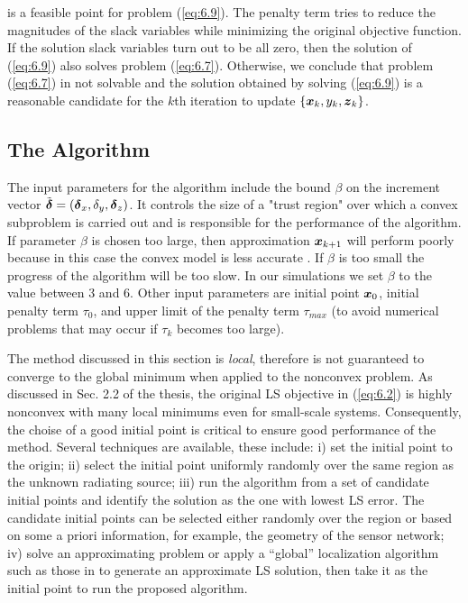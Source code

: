 \noindent
is a feasible point for problem (\ref{eq:6.9}). The penalty term tries to reduce the magnitudes of the slack variables while minimizing the original objective function. If the solution slack variables turn out to be all zero, then the solution  of (\ref{eq:6.9}) also solves problem (\ref{eq:6.7}). Otherwise, we conclude that problem (\ref{eq:6.7}) in not solvable and the solution obtained by solving (\ref{eq:6.9}) is a reasonable candidate for the $k$th iteration to update $\{\mbox{\boldmath$x$}_k, y_k, \mbox{\boldmath$z$}_k\}$.

\subsection{The Algorithm}

The input parameters for the algorithm include the bound $\beta$ on the increment vector $\tilde{\mbox{\boldmath${\delta}$}} =\left(
\mbox{\boldmath${\delta}$}_x, \delta_y, \mbox{\boldmath${\delta}$}_z\right)$. It controls the size of a "trust region" over which a convex subproblem is carried out and is responsible for the performance of the algorithm. If parameter $\beta$ is chosen too large, then approximation $\mbox{\boldmath$x$}_{k+1}$ will perform poorly because in this case the convex model is less accurate \cite{OPTII}. If $\beta$ is too small the progress of the algorithm will be too slow. In our simulations we set  $\beta$ to the value between 3 and 6. Other input parameters are initial point $\mbox{\boldmath$x$}_0$, initial penalty term $\tau_0$, and upper limit of the penalty term $\tau_{max}$ (to avoid numerical problems that may occur  if $\tau_k$ becomes too large).

The method discussed in this section is \textit{local}, therefore is not guaranteed to converge to the global minimum when applied to the nonconvex problem. As discussed in Sec. 2.2 of the thesis, the original LS objective in (\ref{eq:6.2}) is highly nonconvex with many local minimums even for small-scale systems. Consequently, the choise of a good initial point is critical to ensure good performance of the method. Several techniques are available, these include: i) set the initial point to the origin; ii) select the initial point uniformly randomly over the same region as the unknown radiating source; iii) run the algorithm from a set of candidate initial points and identify the solution as the one with lowest LS error.  The candidate initial points can be selected either randomly over the region or based on some  a priori information, for example, the geometry of the sensor network; iv) solve an approximating problem or apply a “global” localization algorithm such as those in \cite{BeckStLi} to generate an approximate LS solution, then take it as the initial point to run the proposed algorithm. 

